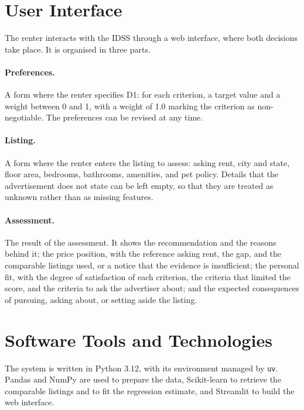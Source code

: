 \documentclass[12pt,a4paper]{report}
\begin{document}
\section{User Interface}

The renter interacts with the IDSS through a web interface, where both
decisions take place. It is organised in three parts.

\paragraph{Preferences.} A form where the renter specifies D1: for each
criterion, a target value and a weight between 0 and 1, with a weight of
1.0 marking the criterion as non-negotiable. The preferences can be
revised at any time.

\paragraph{Listing.} A form where the renter enters the listing to assess:
asking rent, city and state, floor area, bedrooms, bathrooms, amenities,
and pet policy. Details that the advertisement does not state can be left
empty, so that they are treated as unknown rather than as missing
features.

\paragraph{Assessment.} The result of the assessment. It shows the
recommendation and the reasons behind it; the price position, with the
reference asking rent, the gap, and the comparable listings used, or a
notice that the evidence is insufficient; the personal fit, with the degree
of satisfaction of each criterion, the criteria that limited the score, and
the criteria to ask the advertiser about; and the expected consequences of
pursuing, asking about, or setting aside the listing.

\section{Software Tools and Technologies}

The system is written in Python 3.12, with its environment managed by
\texttt{uv}. Pandas and NumPy are used to prepare the data, Scikit-learn
to retrieve the comparable listings and to fit the regression estimate, and
Streamlit to build the web interface.

\end{document}
